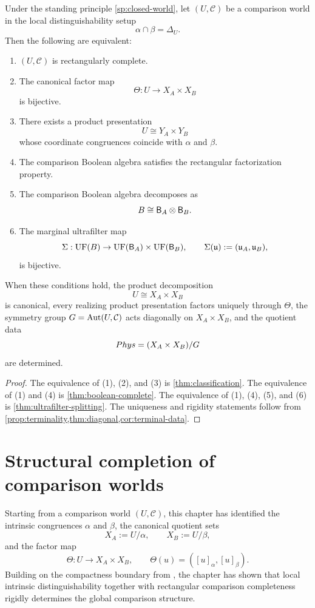 \begin{theorem}
	\label{thm:comparison-completeness-rigidity}
	Under the standing principle \cref{sp:closed-world}, let
	\((U,\mathcal C)\) be a comparison world in the local distinguishability
	setup
	\[
		\alpha\cap\beta=\Delta_U.
	\]
	Then the following are equivalent:
	\begin{enumerate}[label=\textup{(\arabic*)}]
		\item \((U,\mathcal C)\) is rectangularly complete.
		\item The canonical factor map
		      \[
			      \Theta:U\to X_A\times X_B
		      \]
		      is bijective.
		\item There exists a product presentation
		      \[
			      U\cong Y_A\times Y_B
		      \]
		      whose coordinate congruences coincide with \(\alpha\) and \(\beta\).
		\item The comparison Boolean algebra satisfies the rectangular
		      factorization property.
		\item The comparison Boolean algebra decomposes as
		      \[
			      B\cong\mathsf B_A\otimes\mathsf B_B.
		      \]
		\item The marginal ultrafilter map
		      \[
			      \Sigma:\operatorname{UF}(B)\to\operatorname{UF}(\mathsf B_A)\times\operatorname{UF}(\mathsf B_B),
			      \qquad
			      \Sigma(\mathfrak u):=(\mathfrak u_A,\mathfrak u_B),
		      \]
		      is bijective.
	\end{enumerate}
	When these conditions hold, the product decomposition
	\[
		U\cong X_A\times X_B
	\]
	is canonical, every realizing product presentation factors uniquely
	through \(\Theta\), the symmetry group \(G=\operatorname{Aut}(U,\mathcal C)\) acts
	diagonally on \(X_A\times X_B\), and the quotient data
	\[
		Phys=(X_A\times X_B)/G
	\]
	are determined.
\end{theorem}
\begin{proof}
	The equivalence of \textup{(1)}, \textup{(2)}, and \textup{(3)} is
	\cref{thm:classification}. The equivalence of \textup{(1)} and
	\textup{(4)} is \cref{thm:boolean-complete}. The equivalence of
	\textup{(1)}, \textup{(4)}, \textup{(5)}, and \textup{(6)} is
	\cref{thm:ultrafilter-splitting}. The uniqueness and rigidity
	statements follow from \cref{prop:terminality,thm:diagonal,cor:terminal-data}.
\end{proof}
\section{Structural completion of comparison worlds}
\label{sec:part1-structural-completion}
Starting from a comparison world \((U,\mathcal C)\), this chapter has
identified the intrinsic congruences \(\alpha\) and \(\beta\), the
canonical quotient sets
\[
	X_A:=U/\alpha,
	\qquad
	X_B:=U/\beta,
\]
and the factor map
\[
	\Theta:U\to X_A\times X_B,
	\qquad
	\Theta(u)=([u]_\alpha,[u]_\beta).
\]
Building on the compactness boundary from , the
chapter has shown that local intrinsic distinguishability together with
rectangular comparison completeness rigidly determines the global
comparison structure.

